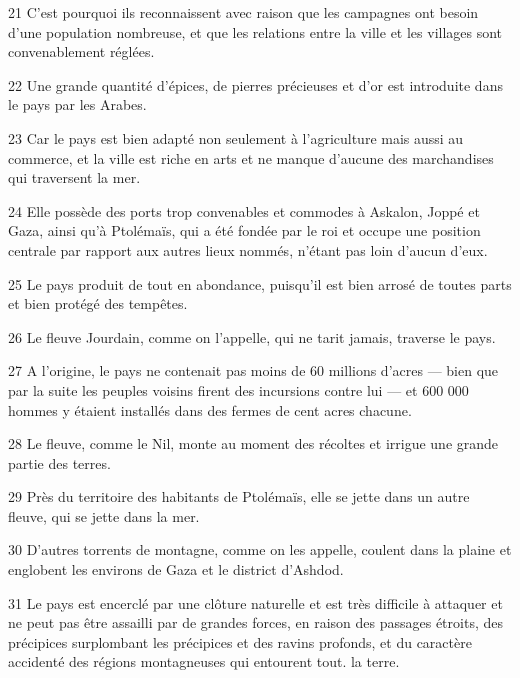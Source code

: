 \par 21 C'est pourquoi ils reconnaissent avec raison que les campagnes ont besoin d'une population nombreuse, et que les relations entre la ville et les villages sont convenablement réglées.

\par 22 Une grande quantité d'épices, de pierres précieuses et d'or est introduite dans le pays par les Arabes.

\par 23 Car le pays est bien adapté non seulement à l'agriculture mais aussi au commerce, et la ville est riche en arts et ne manque d'aucune des marchandises qui traversent la mer.

\par 24 Elle possède des ports trop convenables et commodes à Askalon, Joppé et Gaza, ainsi qu'à Ptolémaïs, qui a été fondée par le roi et occupe une position centrale par rapport aux autres lieux nommés, n'étant pas loin d'aucun d'eux.

\par 25 Le pays produit de tout en abondance, puisqu'il est bien arrosé de toutes parts et bien protégé des tempêtes.

\par 26 Le fleuve Jourdain, comme on l'appelle, qui ne tarit jamais, traverse le pays.

\par 27 A l'origine, le pays ne contenait pas moins de 60 millions d'acres — bien que par la suite les peuples voisins firent des incursions contre lui — et 600 000 hommes y étaient installés dans des fermes de cent acres chacune.

\par 28 Le fleuve, comme le Nil, monte au moment des récoltes et irrigue une grande partie des terres.

\par 29 Près du territoire des habitants de Ptolémaïs, elle se jette dans un autre fleuve, qui se jette dans la mer.

\par 30 D'autres torrents de montagne, comme on les appelle, coulent dans la plaine et englobent les environs de Gaza et le district d'Ashdod.

\par 31 Le pays est encerclé par une clôture naturelle et est très difficile à attaquer et ne peut pas être assailli par de grandes forces, en raison des passages étroits, des précipices surplombant les précipices et des ravins profonds, et du caractère accidenté des régions montagneuses qui entourent tout. la terre.


